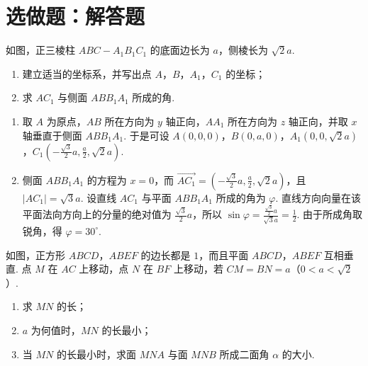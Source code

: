 \section{选做题：解答题}
\begin{problem}[甲]
如图，正三棱柱 \(ABC - A_{1}B_{1}C_{1}\) 的底面边长为 \(a\)，侧棱长为 \(\sqrt{2}a\).

\begin{enumerate}
\item 建立适当的坐标系，并写出点 \(A\)，\(B\)，\(A_{1}\)，\(C_{1}\) 的坐标；
\item 求 \(AC_{1}\) 与侧面 \(ABB_{1}A_{1}\) 所成的角.
\end{enumerate}

\FloatBarrier
\end{problem}

\begin{solution}
\begin{enumerate}
\item 取 \(A\) 为原点，\(AB\) 所在方向为 \(y\) 轴正向，\(AA_1\) 所在方向为 \(z\) 轴正向，并取 \(x\) 轴垂直于侧面 \(ABB_1A_1\). 于是可设 \(A(0,0,0)\)，\(B(0,a,0)\)，\(A_1(0,0,\sqrt{2}a)\)，\(C_1\left(-\frac{\sqrt{3}}{2}a,\frac{a}{2},\sqrt{2}a\right)\).
\item 侧面 \(ABB_1A_1\) 的方程为 \(x=0\)，而
\(\overrightarrow{AC_1}=\left(-\frac{\sqrt{3}}{2}a,\frac{a}{2},\sqrt{2}a\right)\)，且 \(|AC_1|=\sqrt{3}a\).
设直线 \(AC_1\) 与平面 \(ABB_1A_1\) 所成的角为 \(\varphi\). 直线方向向量在该平面法向方向上的分量的绝对值为 \(\frac{\sqrt{3}}{2}a\)，所以
\(\sin\varphi=\frac{\frac{\sqrt{3}}{2}a}{\sqrt{3}a}=\frac{1}{2}\).
由于所成角取锐角，得 \(\varphi=30^{\circ}\).
\end{enumerate}
\end{solution}

\reuseproblemnumber
\begin{problem}[乙]
如图，正方形 \(ABCD\)，\(ABEF\) 的边长都是 \(1\)，而且平面 \(ABCD\)，\(ABEF\) 互相垂直. 点 \(M\) 在 \(AC\) 上移动，点 \(N\) 在 \(BF\) 上移动，若 \(CM = BN = a\)（\(0 < a < \sqrt{2}\)）.

\begin{enumerate}
\item 求 \(MN\) 的长；
\item \(a\) 为何值时，\(MN\) 的长最小；
\item 当 \(MN\) 的长最小时，求面 \(MNA\) 与面 \(MNB\) 所成二面角 \(\alpha\) 的大小.
\end{enumerate}

\FloatBarrier
\end{problem}

